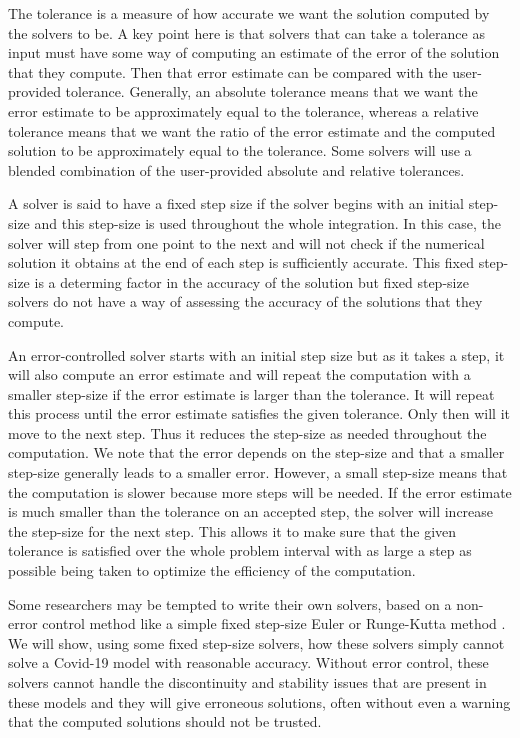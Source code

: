 The tolerance is a measure of how accurate we want the solution computed by the solvers to be. A key point here is that solvers that can take a tolerance as input must have some way of computing an estimate of the error of the solution that they compute. Then that error estimate can be compared with the user-provided tolerance. Generally, an absolute tolerance means that we want the error estimate to be approximately equal to the tolerance, whereas a relative tolerance means that we want the ratio of the error estimate and the computed solution to be approximately equal to the tolerance. Some solvers will use a blended combination of the user-provided absolute and relative tolerances.

A solver is said to have a fixed step size if the solver begins with an initial step-size and this step-size is used throughout the whole integration. In this case, the solver will step from one point to the next and will not check if the numerical solution it obtains at the end of each step is sufficiently accurate. This fixed step-size is a determing factor in the accuracy of the solution but fixed step-size solvers do not have a way of assessing the accuracy of the solutions that they compute.

An error-controlled solver starts with an initial step size but as it takes a step, it will also compute an error estimate and will repeat the computation with a smaller step-size if the error estimate is larger than the tolerance. It will repeat this process until the error estimate satisfies the given tolerance. Only then will it move to the next step. Thus it reduces the step-size as needed throughout the computation. We note that the error depends on the step-size and that a smaller step-size generally leads to a smaller error. However, a small step-size means that the computation is slower because more steps will be needed. If the error estimate is much smaller than the tolerance on an accepted step, the solver will increase the step-size for the next step. This allows it to make sure that the given tolerance is satisfied over the whole problem interval with as large a step as possible being taken to optimize the efficiency of the computation.

Some researchers may be tempted to write their own solvers, based on a non-error control method like a simple fixed step-size Euler or Runge-Kutta method \cite{MR3822086}. We will show, using some fixed step-size solvers, how these solvers simply cannot solve a Covid-19 model with reasonable accuracy. Without error control, these solvers cannot handle the discontinuity and stability issues that are present in these models and they will give erroneous solutions, often without even a warning that the computed solutions should not be trusted.

